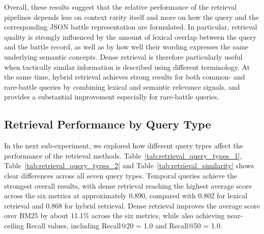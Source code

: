 Overall, these results suggest that the relative performance of the retrieval pipelines depends less on context rarity itself and more on how the query and the corresponding JSON battle representation are formulated. In particular, retrieval quality is strongly influenced by the amount of lexical overlap between the query and the battle record, as well as by how well their wording expresses the same underlying semantic concepts. Dense retrieval is therefore particularly useful when tactically similar information is described using different terminology. At the same time, hybrid retrieval achieves strong results for both common- and rare-battle queries by combining lexical and semantic relevance signals, and provides a substantial improvement especially for rare-battle queries.
\subsection{Retrieval Performance by Query Type}
In the next sub-experiment, we explored how different query types affect the performance of the retrieval methods. Table~\ref{tab:retrieval_query_types_1}, Table~\ref{tab:retrieval_query_types_2} and Table~\ref{tab:retrieval_similarity} shows clear differences across all seven query types. Temporal queries achieve the strongest overall results, with dense retrieval reaching the highest average score across the six metrics at approximately 0.890, compared with 0.802 for lexical retrieval and 0.868 for hybrid retrieval. Dense retrieval improves the average score over BM25 by about 11.1\% across the six metrics, while also achieving near-ceiling Recall values, including Recall@20 = 1.0 and Recall@50 = 1.0.
